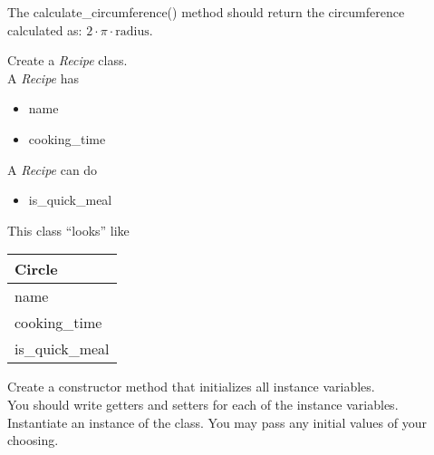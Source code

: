 \documentclass{article}
\newcommand{\tab}{\hspace*{0.25in}}
\begin{document}
\begin{enumerate}
	The calculate\_circumference() method should return the circumference calculated as: $2 \cdot \pi \cdot \text{radius}$.\\




	\begin{minipage}{.6\textwidth}
		\item Create a \textit{Recipe} class.\\
		A \textit{Recipe} has
		\begin{itemize}
			\item name 
			\item cooking\_time
		\end{itemize}

		A \textit{Recipe} can do
		\begin{itemize}
			\item is\_quick\_meal
		\end{itemize}
	\end{minipage}
	\begin{minipage}{.4\textwidth}
		This class ``looks'' like 
				
		\vspace*{1em}
		\begin{tabular}{|l|}
			\hline Circle\\ \hline
			name\\ cooking\_time \\  \hline
			is\_quick\_meal\\ \hline
		\end{tabular}
	\end{minipage}

	\vspace*{2ex}
	Create a constructor method that initializes all instance variables.\\
	You should write getters and setters for each of the instance variables.\\
	Instantiate an instance of the class. You may pass any initial values of your choosing.	


\end{enumerate}
\end{document}
